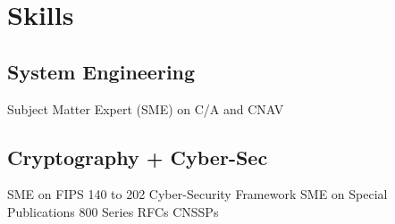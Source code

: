 \documentclass[letterpaper]{deedy-resume} %
\begin{document}
\begin{minipage}[t]{0.33\textwidth}
\sectionspace %


\section{Skills}

\subsection{System Engineering}

Subject Matter Expert (SME) on C/A and CNAV
\sectionspace %
\subsection{Cryptography + Cyber-Sec}
SME on FIPS 140 to 202\textbullet{} Cyber-Security Framework \textbullet{} SME on Special Publications 800 Series \textbullet{} RFCs \textbullet{} CNSSPs \\

\sectionspace %


\end{minipage} %
\hfill
%
%
\end{document}
